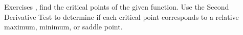 {\noindent Exercises}
{, find the critical points of the given function. Use the Second Derivative Test to determine if each critical point corresponds to a relative maximum, minimum, or saddle point.
}
